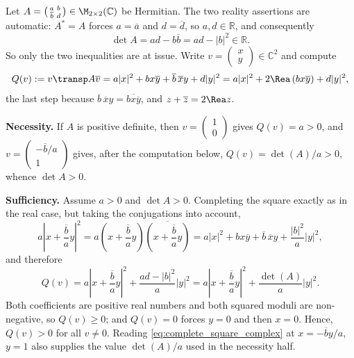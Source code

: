 \begin{exercisesolution}
\label{sol:pos_def_2x2_complex}
  Let $A = \left(\begin{smallmatrix} a & b \\ \overline{b} & d \end{smallmatrix}\right) \in \M_{2 \times 2}(\mathbb{C})$ be Hermitian. The two reality assertions are automatic: $A^* = A$ forces $a = \overline{a}$ and $d = \overline{d}$, so $a, d \in \mathbb{R}$, and consequently
  \[ \det A = ad - b\overline{b} = ad - |b|^2 \in \mathbb{R}. \]
  So only the two inequalities are at issue. Write $v = \left(\begin{smallmatrix} x \\ y \end{smallmatrix}\right) \in \mathbb{C}^2$ and compute
  \[ Q(v) := v\transp A \overline{v} = a|x|^2 + b x \overline{y} + \overline{b} \, \overline{x} y + d|y|^2 = a|x|^2 + 2 \Rea \left( b x \overline{y} \right) + d |y|^2, \]
  the last step because $\overline{b}\,\overline{x}y = \overline{b x \overline{y}}$, and $z + \overline{z} = 2\Rea z$.

  \textbf{Necessity.} If $A$ is positive definite, then $v = \left(\begin{smallmatrix} 1 \\ 0 \end{smallmatrix}\right)$ gives $Q(v) = a > 0$, and $v = \left(\begin{smallmatrix} -\overline{b}/a \\ 1 \end{smallmatrix}\right)$ gives, after the computation below, $Q(v) = \det(A)/a > 0$, whence $\det A > 0$.

  \textbf{Sufficiency.} Assume $a > 0$ and $\det A > 0$. Completing the square exactly as in the real case, but taking the conjugations into account,
  \[ a \left| x + \frac{\overline{b}}{a} y \right|^2 = a \left( x + \frac{\overline{b}}{a}y \right) \overline{\left( x + \frac{\overline{b}}{a}y \right)} = a|x|^2 + b x \overline{y} + \overline{b} \, \overline{x} y + \frac{|b|^2}{a}|y|^2, \]
  and therefore
  \begin{equation} \label{eq:complete_square_complex}
    Q(v) = a \left| x + \frac{\overline{b}}{a} y \right|^2 + \frac{ad - |b|^2}{a} |y|^2 = a \left| x + \frac{\overline{b}}{a} y \right|^2 + \frac{\det(A)}{a} |y|^2 .
  \end{equation}
  Both coefficients are positive real numbers and both squared moduli are non-negative, so $Q(v) \ge 0$; and $Q(v) = 0$ forces $y = 0$ and then $x = 0$. Hence, $Q(v) > 0$ for all $v \ne 0$. Reading \eqref{eq:complete_square_complex} at $x = -\overline{b}y/a$, $y = 1$ also supplies the value $\det(A)/a$ used in the necessity half.
\end{exercisesolution}


